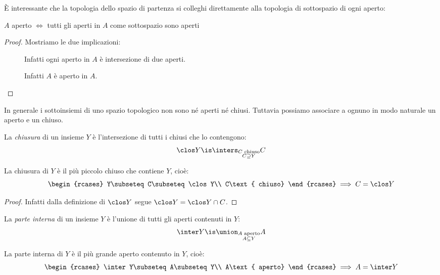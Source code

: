 È interessante che la topologia dello spazio di partenza si colleghi direttamente alla topologia di sottospazio di ogni aperto:

\begin{prop}
	$A$ aperto $\iff$ tutti gli aperti in $A$ come sottospazio sono aperti
\end{prop}

\begin{proof}
	Mostriamo le due implicazioni:
	\begin{description}
		\item[\proofrightarrow]
		Infatti ogni aperto in $A$ è intersezione di due aperti.
		\item[\proofleftarrow]
		Infatti $A$ è aperto in $A$. \qedhere
	\end{description}
\end{proof}


In generale i sottoinsiemi di uno spazio topologico non sono né aperti né chiusi. Tuttavia possiamo associare a ognuno in modo naturale un aperto e un chiuso.

\begin{defn}[Chiusura]
	La \emph{chiusura} di un insieme $Y$ è l'intersezione di tutti i chiusi che lo contengono:
	\[\clos Y\is\inters_{\substack{C\text{ chiuso}\\C\supseteq Y}}C\]
\end{defn}

\begin{prop}
	La chiusura di $Y$ è il più piccolo chiuso che contiene $Y$, cioè:
	\[\begin{rcases}
		Y\subseteq C\subseteq\clos Y\\
		C\text{ chiuso}
	\end{rcases}\implies C=\clos Y\]
\end{prop}

\begin{proof}
	Infatti dalla definizione di $\clos Y$ segue $\clos Y=\clos Y\cap C$.
\end{proof}

\begin{defn}
	La \emph{parte interna} di un insieme $Y$ è l'unione di tutti gli aperti contenuti in $Y$:
	\[\inter Y\is\union_{\substack{A\text{ aperto}\\A\subseteq Y}}A\]
\end{defn}

\begin{prop}
	La parte interna di $Y$ è il più grande aperto contenuto in $Y$, cioè:
	\[\begin{rcases}
		\inter Y\subseteq A\subseteq Y\\
		A\text{ aperto}
	\end{rcases}\implies A=\inter Y\]
\end{prop}

